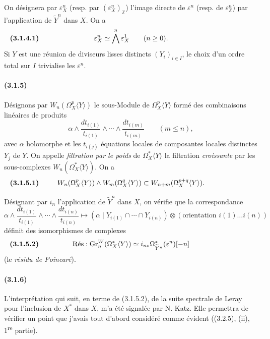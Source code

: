 \documentclass[10pt]{article}
\newcommand{\Z}{\mathbb Z}
\newcommand{\Gr}{\operatorname{Gr}}
\newcommand{\fg}{\guillemotright}
\newcommand{\og}{\guillemotleft}
\begin{document}
On désignera par $\varepsilon_X^n$ (resp. par $(\varepsilon_X^n)_\Z$) l'image directe de $\varepsilon^n$ (resp. de $\varepsilon_\Z^n$) par l'application de $\widetilde Y^n$ dans $X$. On a
\[
\makebox[\textwidth][s]{\textbf{(3.1.4.1)}\hfill$\displaystyle \varepsilon_X^n\simeq\bigwedge^n\varepsilon_X^1\qquad(n\ge0).$\hfill\phantom{\textbf{(3.1.4.1)}}}
\]
Si $Y$ est une réunion de diviseurs lisses distincts $(Y_i)_{i\in I}$, le choix d'un ordre total sur $I$ trivialise les $\varepsilon^n$.

\paragraph{(3.1.5)} Désignons par $W_n(\Omega_X^p\langle Y\rangle)$ le sous-Module de $\Omega_X^p\langle Y\rangle$ formé des combinaisons linéaires de produits
\[
\alpha\wedge\frac{dt_{i(1)}}{t_{i(1)}}\wedge\cdots\wedge
\frac{dt_{i(m)}}{t_{i(m)}}\qquad(m\le n),
\]
avec $\alpha$ holomorphe et les $t_{i(j)}$ équations locales de composantes locales distinctes $Y_j$ de $Y$. On appelle \emph{filtration par le poids} de $\Omega_X^*\langle Y\rangle$ la filtration \emph{croissante} par les sous-complexes $W_n(\Omega_X^*\langle Y\rangle)$. On a
\[
\makebox[\textwidth][s]{\textbf{(3.1.5.1)}\hfill$\displaystyle W_n(\Omega_X^p\langle Y\rangle)\wedge W_m(\Omega_X^q\langle Y\rangle)\subset W_{n+m}(\Omega_X^{p+q}\langle Y\rangle).$\hfill\phantom{\textbf{(3.1.5.1)}}}
\]

Désignant par $i_n$ l'application de $\widetilde Y^n$ dans $X$, on vérifie que la correspondance
\[
\alpha\wedge\frac{dt_{i(1)}}{t_{i(1)}}\wedge\cdots\wedge
\frac{dt_{i(n)}}{t_{i(n)}}
\longmapsto
(\alpha\mid Y_{i(1)}\cap\cdots\cap Y_{i(n)})\otimes
(\text{orientation }i(1)\ldots i(n))
\]
définit des isomorphismes de complexes
\[
\makebox[\textwidth][s]{\textbf{(3.1.5.2)}\hfill$\displaystyle \operatorname{R\acute{e}s}:\Gr_n^W(\Omega_X^*\langle Y\rangle)\simeq i_{n*}\Omega_{\widetilde Y^n}^*(\varepsilon^n)[-n]$\hfill\phantom{\textbf{(3.1.5.2)}}}
\]
(le \emph{\og résidu de Poincaré\fg}).

\paragraph{(3.1.6)} L'interprétation qui suit, en terme de (3.1.5.2), de la suite spectrale de Leray pour l'inclusion de $X^*$ dans $X$, m'a été signalée par N. Katz. Elle permettra de vérifier un point que j'avais tout d'abord considéré comme évident ((3.2.5), (ii), 1\textsuperscript{re} partie).
\end{document}
